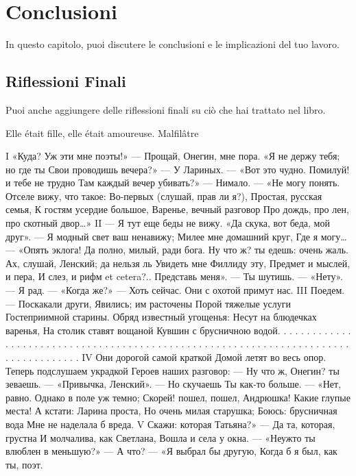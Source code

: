 \chapter{Conclusioni} %
\label{cap:conclusioni} %

In questo capitolo, puoi discutere le conclusioni e le implicazioni del tuo lavoro.

\section{Riflessioni Finali}
Puoi anche aggiungere delle riflessioni finali su ciò che hai trattato nel libro.

Elle était fille, elle était amoureuse.
Malfilâtre

I
«Куда? Уж эти мне поэты!»
— Прощай, Онегин, мне пора.
«Я не держу тебя; но где ты
Свои проводишь вечера?»
— У Лариных. — «Вот это чудно.
Помилуй! и тебе не трудно
Там каждый вечер убивать?»
— Нимало. — «Не могу понять.
Отселе вижу, что такое:
Во-первых (слушай, прав ли я?),
Простая, русская семья,
К гостям усердие большое,
Варенье, вечный разговор
Про дождь, про лен, про скотный двор…»
II
— Я тут еще беды не вижу.
«Да скука, вот беда, мой друг».
— Я модный свет ваш ненавижу;
Милее мне домашний круг,
Где я могу… — «Опять эклога!
Да полно, милый, ради бога.
Ну что ж? ты едешь: очень жаль.
Ах, слушай, Ленский; да нельзя ль
Увидеть мне Филлиду эту,
Предмет и мыслей, и пера,
И слез, и рифм et cetera?..
Представь меня». — Ты шутишь. — «Нету».
— Я рад. — «Когда же?» — Хоть сейчас.
Они с охотой примут нас.
III
Поедем. —
Поскакали други,
Явились; им расточены
Порой тяжелые услуги
Гостеприимной старины.
Обряд известный угощенья:
Несут на блюдечках варенья,
На столик ставят вощаной
Кувшин с брусничною водой.
. . . . . . . . . . . . . .
. . . . . . . . . . . . . .
. . . . . . . . . . . . . .
. . . . . . . . . . . . . .
. . . . . . . . . . . . . .
. . . . . . . . . . . . . .
IV
Они дорогой самой краткой
Домой летят во весь опор.
Теперь подслушаем украдкой
Героев наших разговор:
— Ну что ж, Онегин? ты зеваешь. —
«Привычка, Ленский». — Но скучаешь
Ты как-то больше. — «Нет, равно.
Однако в поле уж темно;
Скорей! пошел, пошел, Андрюшка!
Какие глупые места!
А кстати: Ларина проста,
Но очень милая старушка;
Боюсь: брусничная вода
Мне не наделала б вреда.
V
Скажи: которая Татьяна?»
— Да та, которая, грустна
И молчалива, как Светлана,
Вошла и села у окна. —
«Неужто ты влюблен в меньшую?»
— А что? — «Я выбрал бы другую,
Когда б я был, как ты, поэт.

